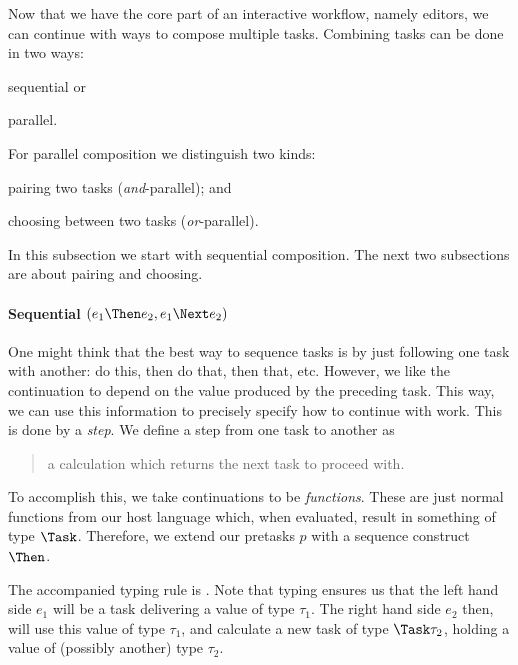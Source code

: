 Now that we have the core part of an interactive workflow,
namely editors,
we can continue with ways to compose multiple tasks.
Combining tasks can be done in two ways:
\begin{enumerate*}
  \item sequential or
  \item parallel.
\end{enumerate*}
For parallel composition we distinguish two kinds:
\begin{enumerate*}[(a)]
  \item pairing two tasks (\emph{and}-parallel); and
  \item choosing between two tasks (\emph{or}-parallel).
\end{enumerate*}
In this subsection we start with sequential composition.
The next two subsections are about pairing and choosing.



\paragraph{Sequential $(e_1 \Then e_2, e_1 \Next e_2)$}

One might think that the best way to sequence tasks is by just following one task with another:
do this, then do that, then that, etc.
However, we like the continuation to depend on the value produced by the preceding task.
This way, we can use this information to precisely specify how to continue with work.
This is done by a \emph{step}.
We define a step from one task to another as
\begin{quote}
  a calculation which returns the next task to proceed with.
\end{quote}

To accomplish this,
we take continuations to be \emph{functions}.
These are just normal functions from our host language which,
when evaluated, result in something of type $\Task$.
Therefore,
we extend our pretasks $p$ with a sequence construct $\Then$.

The accompanied typing rule is .
Note that typing ensures us that the left hand side $e_1$ will be a task delivering a value of type $\tau_1$.
The right hand side $e_2$ then, will use this value of type $\tau_1$,
and calculate a new task of type $\Task \tau_2$,
holding a value of (possibly another) type $\tau_2$.



